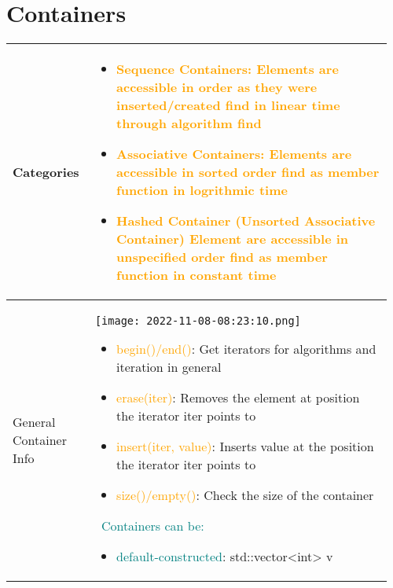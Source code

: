 \documentclass[main.tex,fontsize=8pt,paper=a4,paper=portrait,DIV=calc,]{scrartcl}
\begin{document}
\begin{table}[ht!]
\section{Containers}
\begin{tabular}{|m{0.2\linewidth}|m{0.755\linewidth}|}
\hline
Categories &
\vspace{2mm}
\begin{itemize}
\item \textcolor{orange}{Sequence Containers: \newline
  Elements are accessible in order as they were inserted/created\newline
  find in linear time through algorithm find}
\item \textcolor{orange}{Associative Containers:\newline
  Elements are accessible in sorted order\newline
  find as member function in logrithmic time}
\item \textcolor{orange}{Hashed Container (Unsorted Associative Container)\newline
  Element are accessible in unspecified order\newline
  find as member function in constant time}
\vspace{2mm}
\end{itemize}\\ 
\hline
General Container Info &
\vspace{2mm}
\texttt{[image: 2022-11-08-08:23:10.png]}\newline
\begin{itemize}
\item \textcolor{orange}{begin()/end()}: Get iterators for algorithms and iteration in general
\item \textcolor{orange}{erase(iter)}: Removes the element at position the iterator iter points to
\item \textcolor{orange}{insert(iter, value)}: Inserts value at the position the iterator iter points to
\item \textcolor{orange}{size()/empty()}: Check the size of the container
\vspace{2mm}
\end{itemize}
\, \newline
\textcolor{teal}{Containers can be:}\newline
\begin{itemize}
  \item \textcolor{teal}{default-constructed}: std::vector<int> v{}

\end{itemize}
\end{tabular}
\end{table}
\end{document}

